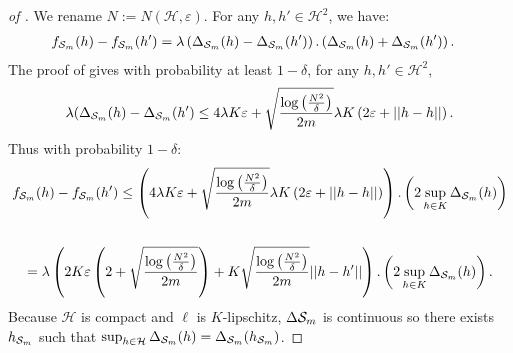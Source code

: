 \begin{noaddcontents}
\begin{proof}[of ]
We rename $N:= N(\mathcal{H},\varepsilon)$.
For any $h,h'\in \mathcal{H}^2$, we have:
\begin{align*}
f_{\mathcal{S}_m}(h)-f_{\mathcal{S}_m}(h')  & = \lambda\left(\Delta_{\mathcal{S}_m}(h)- \Delta_{\mathcal{S}_m}(h')\right).\left(\Delta_{\mathcal{S}_m}(h)+ \Delta_{\mathcal{S}_m}(h')\right).
\end{align*}
The proof of  gives with probability at least $1-\delta$, for any $h,h'\in \mathcal{H}^2$,
\[\lambda(\Delta_{\mathcal{S}_m}(h)-\Delta_{\mathcal{S}_m}(h') \leq 4\lambda K \varepsilon + \sqrt{\frac{\log\left(\frac{N^2}{\delta}\right)}{2m}} \lambda K \left( 2\varepsilon+ ||h-h||\right).  \]
Thus with probability $1-\delta$:
\begin{multline*}
f_{\mathcal{S}_m}(h)-f_{\mathcal{S}_m}(h')  \leq \left(4\lambda K \varepsilon + \sqrt{\frac{\log\left(\frac{N^2}{\delta}\right)}{2m}} \lambda K \left( 2\varepsilon+ ||h-h||\right) \right).\left(2 \sup_{h\in K} \Delta_{\mathcal{S}_m}(h)  \right) \\
\\ = \lambda \left(2K\varepsilon\left( 2 + \sqrt{\frac{\log\left(\frac{N^2}{\delta}\right)}{2m}}  \right) +  K\sqrt{\frac{\log\left(\frac{N^2}{\delta}\right)}{2m}}||h-h'|| \right).\left(2 \sup_{h\in K} \Delta_{\mathcal{S}_m}(h)  \right).
\end{multline*}
Because $\mathcal{H}$ is compact and $\ell$ is $K$-lipschitz, $\Delta{\ensuremath{\mathcal{S}}_m}$ is continuous so there exists $h_{\mathcal{S}_m}$ such that $\sup_{h\in \mathcal{H}} \Delta_{\mathcal{S}_m}(h)= \Delta_{\mathcal{S}_m}(h_{\mathcal{S}_m})$.
\medskip


\end{proof}
\end{noaddcontents}
